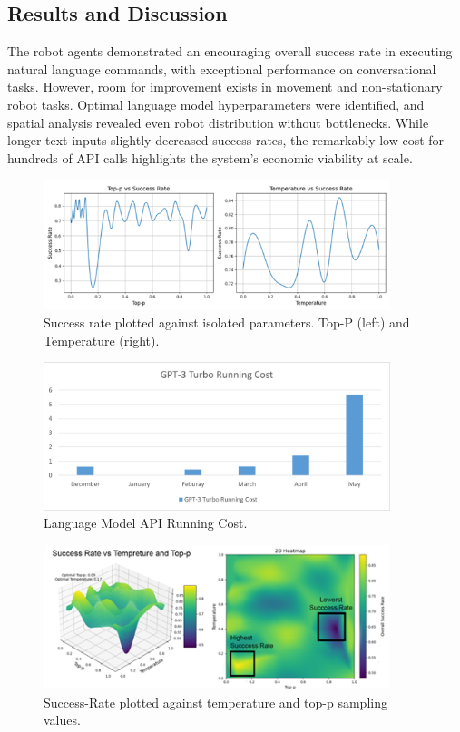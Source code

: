 \documentclass[pdflatex,sn-mathphys-num]{sn-jnl}%
\theoremstyle{thmstyleone}%
\theoremstyle{thmstyletwo}%
\theoremstyle{thmstylethree}%
\begin{document}
\subsection{Results and Discussion}
The robot agents demonstrated an encouraging overall success rate in executing natural language commands, with exceptional performance on conversational tasks. However, room for improvement exists in movement and non-stationary robot tasks. Optimal language model hyperparameters were identified, and spatial analysis revealed even robot distribution without bottlenecks. While longer text inputs slightly decreased success rates, the remarkably low cost for hundreds of API calls highlights the system's economic viability at scale.
\begin{figure}[h]
\centering
\includegraphics[width=0.9\textwidth]{figures/Picture7.png}
\caption{Success rate plotted against isolated parameters. Top-P (left) and Temperature (right).}\label{fig11}
\end{figure}
\begin{figure}[h]
\centering
\includegraphics[width=0.9\textwidth]{figures/Picture8.png}
\caption{Language Model API Running Cost.}\label{fig12}
\end{figure}
\begin{figure}[H]
\centering
\includegraphics[width=0.9\textwidth]{figures/Picture1.png}
\caption{ Success-Rate plotted against temperature and top-p sampling values.}\label{fig13}
\end{figure} 
\end{document}
